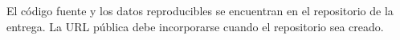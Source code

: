 El código fuente y los datos reproducibles se encuentran en el repositorio de
la entrega. La URL pública debe incorporarse cuando el repositorio sea creado.
